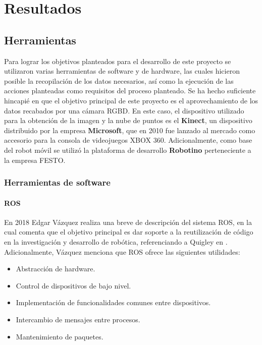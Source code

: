 \chapter{Resultados}
    \section{Herramientas}
    Para lograr los objetivos planteados para el desarrollo de este proyecto se utilizaron varias herramientas de software y de hardware, las cuales hicieron posible la recopilación de los datos necesarios, así como la ejecución de las acciones planteadas como requisitos del proceso planteado.
    Se ha hecho suficiente hincapié en que el objetivo principal de este proyecto es el aprovechamiento de los datos recabados por una cámara RGBD. En este caso, el dispositivo utilizado para la obtención de la imagen y la nube de puntos es el \textbf{Kinect}, un dispositivo distribuido por la empresa \textbf{Microsoft}, que en 2010 fue lanzado al mercado como accesorio para la consola de videojuegos XBOX 360. Adicionalmente, como base del robot móvil se utilizó la plataforma de desarrollo \textbf{Robotino} perteneciente a la empresa FESTO.

    
        \subsection{Herramientas de software}
            \subsubsection{ROS}
            En 2018 Edgar Vázquez realiza una breve de descripción del sistema ROS, en la cual comenta que el objetivo principal es dar soporte a la reutilización de código en la investigación y desarrollo de robótica, referenciando a Quigley en \cite{quigley_ROS}. Adicionalmente, Vázquez menciona que ROS ofrece las siguientes utilidades:
            \begin{itemize}
                \item Abstracción de hardware.
                \item Control de dispositivos de bajo nivel.
                \item Implementación de funcionalidades comunes entre dispositivos.
                \item Intercambio de mensajes entre procesos.
                \item Mantenimiento de paquetes.
            \end{itemize}

